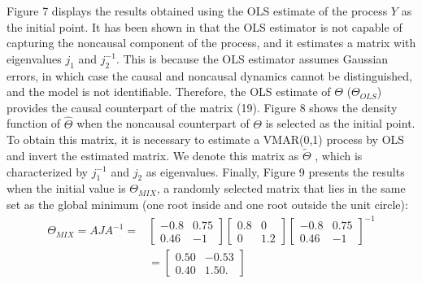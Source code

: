 \documentclass[<1p>]{elsarticle} %
\begin{document}
\indent Figure 7 displays the results obtained using the OLS estimate of the process $Y$ as the initial point. It has been shown in \cite{gourieroux2017noncausal} that the OLS estimator is not capable of capturing the noncausal component of the process, and it estimates a matrix with eigenvalues $j_1$ and $j_2^{-1}$. This is because the OLS estimator assumes Gaussian errors, in which case the causal and noncausal dynamics cannot be distinguished, and the model is not identifiable. Therefore, the OLS estimate of $\Theta$ ($\Theta_{OLS}$) provides the causal counterpart of the matrix (19). Figure 8 shows the density function of $\hat{\Theta}$ when the noncausal counterpart of $\Theta$ is selected as the initial point. To obtain this matrix, it is necessary to estimate a VMAR(0,1) process by OLS and invert the estimated matrix. We denote this matrix as $\widetilde{\Theta}$ , which is characterized by $j_{1}^{-1}$ and $j_{2}$ as eigenvalues. Finally, Figure 9 presents the results when the initial value is $\Theta_{MIX}$, a randomly selected matrix that lies in the same set as the global minimum (one root inside and one root outside the unit circle):
\begin{equation}
\begin{split}
    \Theta_{MIX}=A J A^{-1}=&\begin{bmatrix}
        -0.8 &0.75 \\
        0.46 & -1
    \end{bmatrix} \begin{bmatrix}
                        0.8 & 0\\
                        0 & 1.2
                    \end{bmatrix} \begin{bmatrix}
        -0.8 &0.75 \\
        0.46 & -1
    \end{bmatrix}^{-1}\\& =\begin{bmatrix}
        0.50 & -0.53\\
        0.40 & 1.50.
        \end{bmatrix}
\end{split}
\end{equation}
\end{document}
